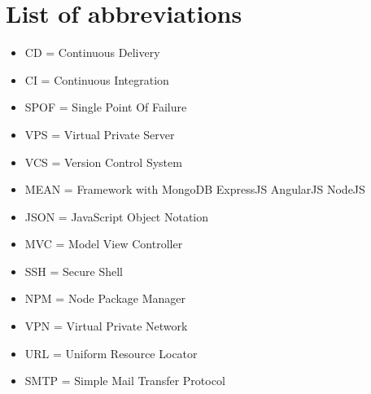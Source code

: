 \newpage
\section{List of abbreviations}
\label{section:List of abbreviations}

\begin{itemize}
  \item CD = Continuous Delivery
  \item CI = Continuous Integration
  \item SPOF = Single Point Of Failure
  \item VPS = Virtual Private Server
  \item VCS = Version Control System
  \item MEAN = Framework with MongoDB ExpressJS AngularJS NodeJS
  \item JSON = JavaScript Object Notation
  \item MVC = Model View Controller
  \item SSH = Secure Shell
  \item NPM = Node Package Manager
  \item VPN = Virtual Private Network
  \item URL = Uniform Resource Locator
  \item SMTP = Simple Mail Transfer Protocol
\end{itemize}
